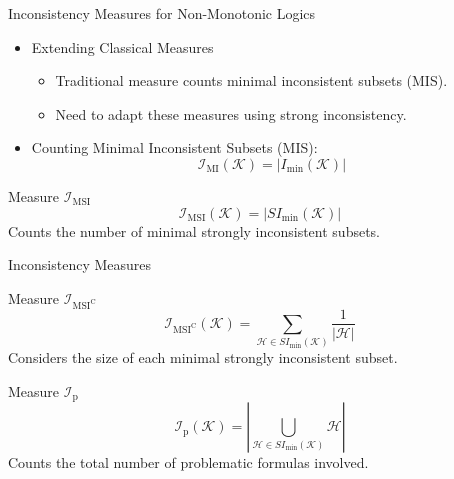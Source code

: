 \begin{frame}{Inconsistency Measures for Non-Monotonic Logics}
    \begin{itemize}
        \item Extending Classical Measures
              \begin{itemize}
                  \item Traditional measure counts minimal inconsistent subsets (MIS).
                  \item Need to adapt these measures using strong inconsistency.
              \end{itemize}
        \item Counting Minimal Inconsistent Subsets (MIS):
              \[
                  \mathcal{I}_{\text{MI}}(\mathcal{K}) = \left| I_{\min}(\mathcal{K}) \right|
              \]
    \end{itemize}
    \begin{block}{Measure \( \mathcal{I}_{\text{MSI}} \)}
        \[
            \mathcal{I}_{\text{MSI}}(\mathcal{K}) = \left| SI_{\min}(\mathcal{K}) \right|
        \]
        Counts the number of minimal strongly inconsistent subsets.
    \end{block}
\end{frame}

\begin{frame}{Inconsistency Measures}
    \begin{block}{Measure \( \mathcal{I}_{\text{MSI}^\text{C}} \)}
        \[
            \mathcal{I}_{\text{MSI}^\text{C}}(\mathcal{K}) = \sum\limits_{\mathcal{H} \in SI_{\min}(\mathcal{K})} \frac{1}{|\mathcal{H}|}
        \]
        Considers the size of each minimal strongly inconsistent subset.
    \end{block}
    \begin{block}{Measure \( \mathcal{I}_{\text{p}} \)}
        \[
            \mathcal{I}_{\text{p}}(\mathcal{K}) = \left| \bigcup\limits_{\mathcal{H} \in SI_{\min}(\mathcal{K})} \mathcal{H} \right|
        \]
        Counts the total number of problematic formulas involved.
    \end{block}
\end{frame}

